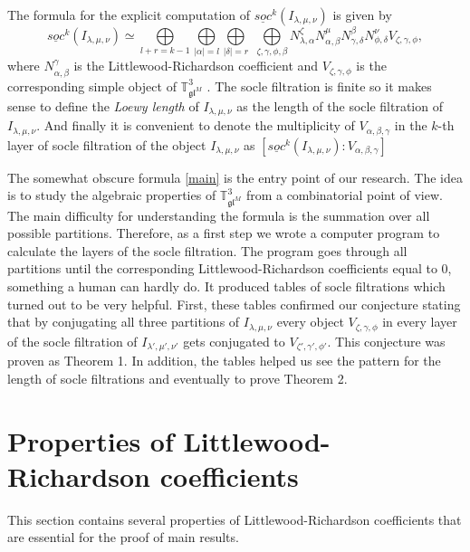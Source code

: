 \documentclass[letterpaper,11pt]{article}
\begin{document}
	The formula for the explicit computation of $\underline{soc}^k(I_{\lambda, \mu, \nu})$ is given by 
	\begin{equation}\label{main}
	\underline{soc}^k(I_{\lambda, \mu, \nu}) \simeq \underset{l+r=k-1}{\bigoplus} \underset{|\alpha| = l}{\bigoplus} \underset{|\delta| = r}{\bigoplus} \,\, \underset{\zeta, \gamma ,\phi, \beta}{\bigoplus} N_{\lambda, \alpha}^\zeta N_{\alpha, \beta}^\mu N_{\gamma, \delta}^\beta N_{\phi, \delta}^\nu V_{\zeta, \gamma, \phi},
	\end{equation} where $N_{\alpha, \beta}^\gamma$ is the Littlewood-Richardson coefficient and $V_{\zeta, \gamma, \phi}$ is the corresponding simple object of $\mathbb{T}^3_{\mathfrak{gl}^M}$ \cite{mackey}. The socle filtration is finite so it makes sense to define the \textit{Loewy length} of $I_{\lambda, \mu, \nu}$ as the length of the socle filtration of $I_{\lambda, \mu, \nu}$. And finally it is convenient to denote the multiplicity of $V_{\alpha, \beta, \gamma}$ in the $k$-th layer of socle filtration of the object $I_{\lambda, \mu, \nu}$ as $[\underline{soc}^k(I_{\lambda, \mu, \nu}):V_{\alpha, \beta, \gamma}]$

	The somewhat obscure formula \eqref{main} is the entry point of our research. The idea is to study the algebraic properties of $\mathbb{T}^3_{\mathfrak{gl}^M}$ from a combinatorial point of view. The main difficulty for understanding the formula is the summation over all possible partitions. Therefore, as a first step we wrote a computer program to calculate the layers of the socle filtration. The program goes through all partitions until the corresponding Littlewood-Richardson coefficients equal to 0, something a human can hardly do. It produced tables of socle filtrations which turned out to be very helpful. First, these tables confirmed our conjecture stating that by conjugating all three partitions of $I_{\lambda, \mu, \nu}$ every object $V_{\zeta, \gamma, \phi}$ in every layer of the socle filtration of $I_{\lambda ', \mu', \nu'}$ gets conjugated to $V_{\zeta', \gamma', \phi'}$. This conjecture was proven as Theorem 1. In addition, the tables helped us see the pattern for the length of socle filtrations and eventually to prove Theorem 2.
	
	\section{Properties of Littlewood-Richardson coefficients}

	This section contains several properties of Littlewood-Richardson coefficients that are essential for the proof of main results.
	
\end{document}
